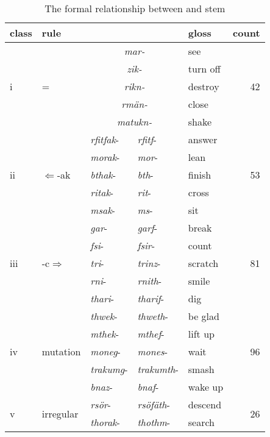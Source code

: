 \begin{table}
\caption{The formal relationship between {\Ext} and {\Rs} stem}
\label{frbearr}
\begin{tabularx}{\textwidth}{lXllXr}
	\lsptoprule
		{class}&{rule} &{\Ext} &{\Rs} &{gloss} &{count}\\\hline
		\multirow{5}{*}{{i}}	&\multirow{5}{*}{{\Ext}={\Rs}} &\multicolumn{2}{|c|}{\emph{mar-}} &see &\multirow{5}{*}{\textsc{42}}\\
		&&\multicolumn{2}{|c|}{\emph{zik-}} &turn off &\\
		&&\multicolumn{2}{|c|}{\emph{rikn-}} &destroy &\\
		&&\multicolumn{2}{|c|}{\emph{rmän-}} &close &\\
		&&\multicolumn{2}{|c|}{\emph{matukn-}} &shake &\\\hline
		\multirow{5}{*}{{ii}} &\multirow{5}{*}{{\Ext}$\Leftarrow$\Rs-ak} &\emph{rfitfak}- &\emph{rfitf}- &answer &\multirow{5}{*}{\textsc{53}}\\
		&&\emph{morak}- &\emph{mor}- &lean &\\
		&&\emph{bthak}- &\emph{bth}- &finish &\\
		&&\emph{ritak}-	&\emph{rit}- &cross &\\
		&&\emph{msak}- &\emph{ms}-	&sit &\\\midrule
		\multirow{5}{*}{{iii}} &\multirow{5}{*}{\Ext-{c}$\Rightarrow$\Rs} &\emph{gar}- &\emph{garf}- &break &\multirow{5}{*}{\textsc{81}}\\
		&&\emph{fsi}- &\emph{fsir}- &count &\\
		&&\emph{tri}- &\emph{trinz}- &scratch &\\
		&&\emph{rni}- &\emph{rnith}- &smile &\\
		&&\emph{thari}- &\emph{tharif}-	&dig &\\\midrule
		\multirow{5}{*}{{iv}} &\multirow{5}{*}{{mutation}} &\emph{thwek}- &\emph{thweth}- &be glad &\multirow{5}{*}{\textsc{96}}\\
		&&\emph{mthek}- &\emph{mthef}- &lift up &\\
		&&\emph{moneg}-	&\emph{mones}- &wait &\\
		&&\emph{trakumg}- &\emph{trakumth}- &smash &\\
		&&\emph{bnaz}- &\emph{bnaf}- &wake up\\\midrule
		\multirow{5}{*}{{v}}	&\multirow{5}{*}{{irregular}} &\emph{rsör}- &\emph{rsöfäth}- & descend &\multirow{5}{*}{\textsc{26}}\\
		&&\emph{thorak}- &\emph{thothm}- &search &\\

\end{tabularx}
\end{table}
